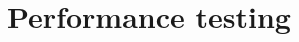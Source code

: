 \documentclass[thesis=M,english]{FITthesis}[2018/10/20]
\begin{document}
{\section{Performance testing}



%
%
%
%



}
\end{document}
